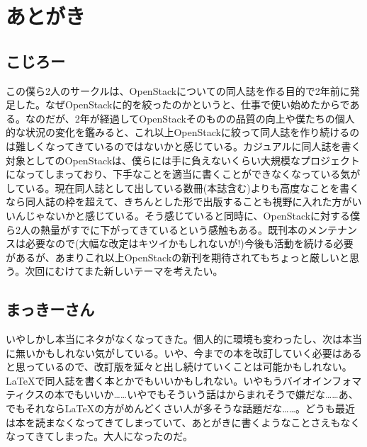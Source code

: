 \documentclass[9pt,b5paper,tombo,openany]{jsbook}
\begin{document}
\chapter{あとがき}


\section*{こじろー}

この僕ら2人のサークルは、OpenStackについての同人誌を作る目的で2年前に発足した。なぜOpenStackに的を絞ったのかというと、仕事で使い始めたからである。なのだが、2年が経過してOpenStackそのものの品質の向上や僕たちの個人的な状況の変化を鑑みると、これ以上OpenStackに絞って同人誌を作り続けるのは難しくなってきているのではないかと感じている。カジュアルに同人誌を書く対象としてのOpenStackは、僕らには手に負えないくらい大規模なプロジェクトになってしまっており、下手なことを適当に書くことができなくなっている気がしている。現在同人誌として出している数冊(本誌含む)よりも高度なことを書くなら同人誌の枠を超えて、きちんとした形で出版することも視野に入れた方がいいんじゃないかと感じている。そう感じていると同時に、OpenStackに対する僕ら2人の熱量がすでに下がってきているという感触もある。既刊本のメンテナンスは必要なので(大幅な改定はキツイかもしれないが!)今後も活動を続ける必要があるが、あまりこれ以上OpenStackの新刊を期待されてもちょっと厳しいと思う。次回にむけてまた新しいテーマを考えたい。

\section*{まっきーさん}

いやしかし本当にネタがなくなってきた。個人的に環境も変わったし、次は本当に無いかもしれない気がしている。いや、今までの本を改訂していく必要はあると思っているので、改訂版を延々と出し続けていくことは可能かもしれない。\LaTeX で同人誌を書く本とかでもいいかもしれない。いやもうバイオインフォマティクスの本でもいいか……いやでもそういう話はからまれそうで嫌だな……あ、でもそれなら\LaTeX の方がめんどくさい人が多そうな話題だな……。どうも最近は本を読まなくなってきてしまっていて、あとがきに書くようなことさえもなくなってきてしまった。大人になったのだ。
\end{document}
